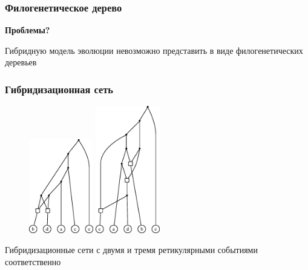 \documentclass[hyperref={unicode}]{beamer}
\begin{document}
\begin{frame}
\frametitle{Филогенетическое дерево}

\textbf{Проблемы?}

Гибридную модель эволюции невозможно представить в виде филогенетических деревьев

\end{frame}




\begin{frame}
\frametitle{Гибридизационная сеть}

\centering

\begin{figure}[t]
	\includegraphics[width=2.8cm]{img/ans.eps}
	\hspace{1cm}
	\includegraphics[width=2.8cm]{img/ans3.eps}
\end{figure}

Гибридизационные сети с двумя и тремя ретикулярными событиями соответственно

\end{frame} 
\end{document}
